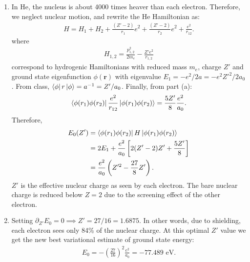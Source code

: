 \documentclass{article}
\theoremstyle{definition}
\newcommand{\p}{\partial}
\newcommand{\lp}{\left(}
\newcommand{\rp}{\right)}
\newcommand{\lb}{\left[}
\newcommand{\rb}{\right]}
\begin{document}
\begin{enumerate}[label = \alph*)]
\begin{align*}
&= \frac{e}{r_1} \lb 1 - e^{-2r_1/a }\lp 1 + \frac{r_1}{a}\rp \rb
\end{align*}
Therefore:
\begin{align*}
V_{ee} &= 
\frac{e}{\pi a^3} \int^\infty_0 
\frac{e}{r_1} \lb 1 - e^{-2r_1/a }\lp 1 + \frac{r_1}{a}\rp \rb
e^{-2r_1/a} 4\pi r_1^2 \,dr_1 \\ 
&= \frac{e^2}{a}\int^\infty_0 \frac{1}{x} \lb 1 - e^{-2x}(1+x) \rb e^{-2x} 4x^2 \,dx\\
&= \frac{e^2}{a}\int^\infty_0 \lb e^{-2x} - e^{-4x}(1+x) \rb 4x\,dx \\
&= \frac{5}{8}\frac{e^2}{a} = \frac{5Z}{8} \frac{e^2}{a_0} = 34.014 \text{ eV}.
\end{align*}

Therefore, the first variational estimate for the ground state energy is:
\begin{align*}
E = \lp -Z^2 + \frac{5Z}{8} \rp \frac{e^2}{a_0} = -74.831 \text{ eV}.
\end{align*}


\item In He, the nucleus is  about 4000 times heaver than each electron. Therefore, we neglect nuclear
motion, and rewrite the He Hamiltonian as:
\begin{align*}
H = H_1 + H_2 + \frac{(Z'-2)}{r_1}e^2 + \frac{(Z'-2)}{r_2}e^2 + \frac{e^2}{r_{12}}.
\end{align*}
where
\begin{align*}
H_{1,2} = \frac{p_{1,2}^2}{2m_e} - \frac{Z'e^2}{r_{1,2}}
\end{align*}
correspond to hydrogenic Hamiltonians with reduced mass $m_e$, charge $Z'$ and ground state
eigenfunction $\phi(\mathbf{r})$ with eigenvalue $E_1 = -e^2/2a = -e^2 Z'^2/2a_0$. From class, $\bra{\phi} r \ket{\phi}   = a^{-1} = Z'/a_0$. Finally, from part (a):
\begin{align*}
\bra{\phi(r_1)\phi(r_2)} \frac{e^2}{r_{12}}  \ket{\phi(r_1)\phi(r_2)} = \frac{5Z'}{8} \frac{e^2}{a_0}.
\end{align*}
Therefore,
\begin{align*}
E_0(Z') &= \bra{\phi(r_1)\phi(r_2)} H \ket{\phi(r_1)\phi(r_2)}  \\
&= 2E_1 + \frac{e^2}{a_0}\lb 2(Z'-2) Z' + \frac{5Z'}{8} \rb \\ 
&= \frac{e^2}{a_0} \lp  Z'^2 - \frac{27}{8}Z' \rp.
\end{align*}
$Z'$ is the effective nuclear charge as seen by each electron. The bare nuclear charge is
reduced below $Z = 2$ due to the screening effect of the other electron.

\item  Setting $\p_{Z'} E_0 = 0 \implies Z' = 27/16 =1.6875$. In other words, due to shielding,
each electron sees only 84\% of the nuclear charge. At this optimal $Z'$ value we get the new
best variational estimate of ground state energy:
\begin{align*}
E_0 = -\lp\frac{27}{16}\rp^2 \frac{e^2}{a_0} = -77.489 \text{ eV}.
\end{align*}

\end{enumerate}
\end{document}
